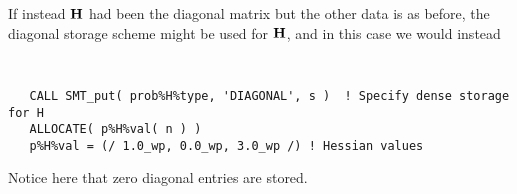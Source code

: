 \documentclass{galahad}
\begin{document}
If instead ${\mathbf{H}}$ had been the diagonal matrix
but the other data is as before, the diagonal storage scheme 
might be used for ${\mathbf{H}}$, and in this case we would instead 
{\tt \small
\begin{verbatim}
   CALL SMT_put( prob%H%type, 'DIAGONAL', s )  ! Specify dense storage for H
   ALLOCATE( p%H%val( n ) )
   p%H%val = (/ 1.0_wp, 0.0_wp, 3.0_wp /) ! Hessian values
\end{verbatim}
}
\noindent
Notice here that zero diagonal entries are stored.
\end{document}
